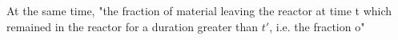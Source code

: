 At the same time, "the fraction of material leaving the reactor at time t which remained in the reactor for a duration greater than $t'$, i.e. the fraction o"  